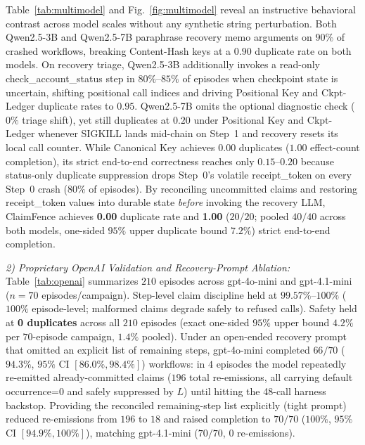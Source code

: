 \documentclass[10pt,journal]{IEEEtran}
\def\CF{ClaimFence}%
\def\texttt#1{#1}%
\theoremstyle{definition}
\theoremstyle{remark}
\newcommand{\CF}{\textsc{ClaimFence}}
\begin{document}
Table~\ref{tab:multimodel} and Fig.~\ref{fig:multimodel} reveal an instructive behavioral contrast across model scales without any synthetic string perturbation. Both \texttt{Qwen2.5-3B} and \texttt{Qwen2.5-7B} paraphrase recovery \texttt{memo} arguments on $90\%$ of crashed workflows, breaking \texttt{Content-Hash} keys at a $0.90$ duplicate rate on both models. On recovery triage, \texttt{Qwen2.5-3B} additionally invokes a read-only \texttt{check\_account\_status} step in $80\%$--$85\%$ of episodes when checkpoint state is uncertain, shifting positional call indices and driving \texttt{Positional Key} and \texttt{Ckpt-Ledger} duplicate rates to $0.95$. \texttt{Qwen2.5-7B} omits the optional diagnostic check ($0\%$ triage shift), yet still duplicates at $0.20$ under \texttt{Positional Key} and \texttt{Ckpt-Ledger} whenever \texttt{SIGKILL} lands mid-chain on Step~1 and recovery resets its local call counter. While \texttt{Canonical Key} achieves $0.00$ duplicates ($1.00$ effect-count completion), its strict end-to-end correctness reaches only $0.15$--$0.20$ because status-only duplicate suppression drops Step~0's volatile \texttt{receipt\_token} on every Step~0 crash ($80\%$ of episodes). By reconciling uncommitted claims and restoring \texttt{receipt\_token} values into durable state \emph{before} invoking the recovery LLM, \CF{} achieves \textbf{0.00} duplicate rate and \textbf{1.00} ($20/20$; pooled $40/40$ across both models, one-sided $95\%$ upper duplicate bound $7.2\%$) strict end-to-end completion.

\emph{2) Proprietary \texttt{OpenAI} Validation and Recovery-Prompt Ablation:} Table~\ref{tab:openai} summarizes $210$ episodes across \texttt{gpt-4o-mini} and \texttt{gpt-4.1-mini}~\cite{openai2024gpt4o} ($n=70$ episodes/campaign). Step-level claim discipline held at $99.57\%$--$100\%$ ($100\%$ episode-level; malformed claims degrade safely to refused calls). Safety held at \textbf{0 duplicates} across all $210$ episodes (exact one-sided $95\%$ upper bound $4.2\%$ per $70$-episode campaign, $1.4\%$ pooled). Under an open-ended recovery prompt that omitted an explicit list of remaining steps, \texttt{gpt-4o-mini} completed $66/70$ ($94.3\%$, $95\%$ CI $[86.0\%, 98.4\%]$) workflows: in $4$ episodes the model repeatedly re-emitted already-committed claims ($196$ total re-emissions, all carrying default \texttt{occurrence=0} and safely suppressed by $L$) until hitting the 48-call harness backstop. Providing the reconciled remaining-step list explicitly (\texttt{tight} prompt) reduced re-emissions from $196$ to $18$ and raised completion to $70/70$ ($100\%$, $95\%$ CI $[94.9\%, 100\%]$), matching \texttt{gpt-4.1-mini} ($70/70$, $0$ re-emissions).
\end{document}
